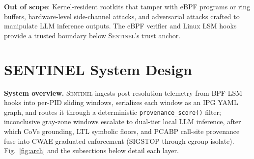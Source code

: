 \documentclass[journal]{IEEEtran}
\newcommand{\sentinel}{\textsc{Sentinel}}
\newcommand{\ipg}{IPG}
\newcommand{\cwae}{CWAE}
\newcommand{\ebpf}{eBPF}
\begin{document}
\noindent\textbf{Out of scope}: Kernel-resident rootkits that tamper with
\ebpf{} programs or ring buffers, hardware-level side-channel attacks, and
adversarial attacks crafted to manipulate LLM inference outputs.  The
\ebpf{} verifier and Linux LSM hooks provide a trusted boundary below
\sentinel{}'s trust anchor.

\section{SENTINEL System Design}\label{sec:design}

\noindent\textbf{System overview.}
\sentinel{} ingests post-resolution telemetry from BPF LSM hooks into per-PID
sliding windows, serializes each window as an \ipg{} YAML graph, and routes it
through a deterministic \texttt{provenance\_score()} filter; inconclusive
gray-zone windows escalate to dual-tier local LLM inference, after which CoVe
grounding, LTL symbolic floors, and PCABP call-site provenance fuse into
\cwae{} graduated enforcement (SIGSTOP through cgroup isolate).
Fig.~\ref{fig:arch} and the subsections below detail each layer.
\end{document}

